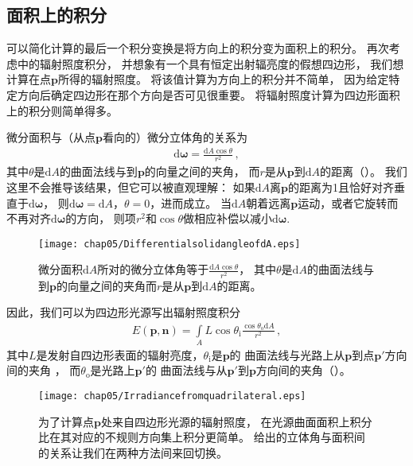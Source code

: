 \subsection{面积上的积分}\label{sub:面积上的积分}
可以简化计算的最后一个积分变换是将方向上的积分变为面积上的积分。
再次考虑中的辐射照度积分，
并想象有一个具有恒定出射辐亮度的假想四边形，
我们想计算在点$\bm p$所得的辐射照度。
将该值计算为方向上的积分并不简单，
因为给定特定方向后确定四边形在那个方向是否可见很重要。
将辐射照度计算为四边形面积上的积分则简单得多。

微分面积与（从点$\bm p$看向的）微分立体角的关系为
\begin{align}\label{eq:5.6}
    \mathrm{d}{\bm\omega}=\frac{\mathrm{d}A\cos\theta}{r^2}\, ,
\end{align}
其中$\theta$是$\mathrm{d}A$的曲面法线与到$\bm p$的向量之间的夹角，
而$r$是从$\bm p$到$\mathrm{d}A$的距离（）。
我们这里不会推导该结果，但它可以被直观理解：
如果$\mathrm{d}A$离$\bm p$的距离为1且恰好对齐垂直于$\mathrm{d}\bm\omega$，
则$\mathrm{d}{\bm\omega}=\mathrm{d}A$，$\theta=0$，进而成立。
当$\mathrm{d}A$朝着远离$\bm p$运动，或者它旋转而不再对齐$\mathrm{d}\bm\omega$的方向，
则项$r^2$和$\cos\theta$做相应补偿以减小$\mathrm{d}\bm\omega$.
\begin{figure}[htbp]
    \centering\texttt{[image: chap05/DifferentialsolidangleofdA.eps]}
    \caption{微分面积$\mathrm{d}A$所对的微分立体角等于$\displaystyle\frac{\mathrm{d}A\cos\theta}{r^2}$，
        其中$\theta$是$\mathrm{d}A$的曲面法线与到$\bm p$的向量之间的夹角而$r$是从$\bm p$到$\mathrm{d}A$的距离。}
    \label{fig:5.16}
\end{figure}

因此，我们可以为四边形光源写出辐射照度积分
\begin{align*}
    E({\bm p},{\bm n})=\int\limits_A L\cos\theta_{\mathrm{i}}\frac{\cos\theta_{\mathrm{o}}\mathrm{d}A}{r^2}\, ,
\end{align*}
其中$L$是发射自四边形表面的辐射亮度，$\theta_{\mathrm{i}}$是$\bm p$的
曲面法线与光路上从$\bm p$到点$\bm p'$方向间的夹角
，
而$\theta_{\mathrm{o}}$是光路上$\bm p'$的
曲面法线与从$\bm p'$到$\bm p$方向间的夹角（）。
\begin{figure}[htbp]
    \centering\texttt{[image: chap05/Irradiancefromquadrilateral.eps]}
    \caption{为了计算点$\bm p$处来自四边形光源的辐射照度，
        在光源曲面面积上积分比在其对应的不规则方向集上积分更简单。
        给出的立体角与面积间的关系让我们在两种方法间来回切换。}
    \label{fig:5.17}
\end{figure}